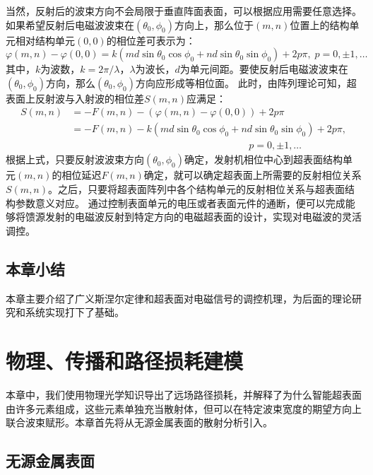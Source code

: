 \documentclass[supercite]{HustGraduPaper}
\begin{document}
当然，反射后的波束方向不会局限于垂直阵面表面，可以根据应用需要任意选择。
如果希望反射后电磁波波束在$(\theta_0,\phi_0)$方向上，那么位于$(m,n)$位置上的结构单元相对结构单元$(0,0)$的相位差可表示为：
\begin{equation}
	\varphi(m,n)-\varphi(0,0)=k(md\sin⁡\theta_0 \cos⁡\phi_0+nd\sin⁡\theta_0 \sin\phi_0)+2p\pi,\;p = 0, \pm 1,\dots 
\end{equation}
其中，$k$为波数，$k=2\pi/ \lambda$，$\lambda$为波长，$d$为单元间距。要使反射后电磁波波束在$(\theta_0,\phi_0)$方向，那么$(\theta_0,\phi_0)$方向应形成等相位面。
此时，由阵列理论可知，超表面上反射波与入射波的相位差$S(m,n)$应满足：
\begin{equation}
	\begin{aligned}
		S(m,n)&=-F(m,n)-(\varphi(m,n)-\varphi(0,0))+2p\pi \\
	          &=-F(m,n)-k(md\sin⁡\theta_0 \cos⁡\phi_0+nd\sin⁡\theta_0 \sin\phi_0)+2p\pi ,\\
			  &\qquad \qquad \qquad \qquad \qquad \qquad \qquad \qquad \qquad p = 0, \pm 1,\dots 
	\end{aligned}
\end{equation}
根据上式，只要反射波波束方向$(\theta_0,\phi_0)$确定，发射机相位中心到超表面结构单元$(m,n)$的相位延迟$F(m,n)$确定，就可以确定超表面上所需要的反射相位关系$S(m,n)$。之后，只要将超表面阵列中各个结构单元的反射相位关系与超表面结构参数意义对应。
通过控制表面单元的电压或者表面元件的通断，便可以完成能够将馈源发射的电磁波反射到特定方向的电磁超表面的设计，实现对电磁波的灵活调控。

\subsection{本章小结}

本章主要介绍了广义斯涅尔定律和超表面对电磁信号的调控机理，为后面的理论研究和系统实现打下了基础。

\section{物理、传播和路径损耗建模}\label{sec:modeling}

本章中，我们使用物理光学知识导出了远场路径损耗\cite{emil2019intelligent}，并解释了为什么智能超表面由许多元素组成，这些元素单独充当散射体，但可以在特定波束宽度的期望方向上联合波束赋形。本章首先将从无源金属表面的散射分析引入。

\subsection{无源金属表面}\label{subsec:metal-plate}
\end{document}
